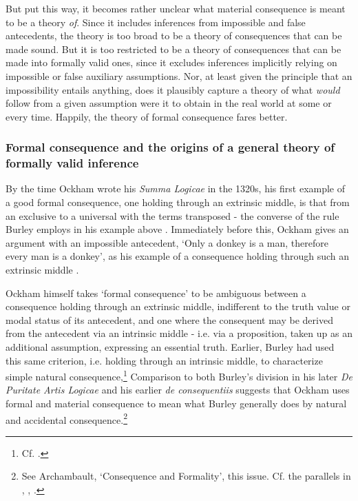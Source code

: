\documentclass[]{article}
\begin{document}
But put this way, it becomes rather unclear what material consequence is meant to be a theory \textit{of}. Since it includes inferences from impossible and false antecedents, the theory is too broad to be a theory of consequences that can be made sound. But it is too restricted to be a theory of consequences that can be made into formally valid ones, since it excludes inferences implicitly relying on impossible or false auxiliary assumptions. Nor, at least given the principle that an impossibility entails anything, does it plausibly capture a theory of what \textit{would} follow from a given assumption were it to obtain in the real world at some or every time. Happily, the theory of formal consequence fares better.
\subsubsection{Formal consequence and the origins of a general theory of formally valid inference}
By the time Ockham wrote his \textit{Summa Logicae} in the 1320s, his first example of a good formal consequence, one holding through an extrinsic middle, is that from an exclusive to a universal with the terms transposed - the converse of the rule Burley employs in his example above \autocite[III-3, c.1, p. 589.46-50]{OckhamSL}. Immediately before this, Ockham gives an argument with an impossible antecedent, `Only a donkey is a man, therefore every man is a donkey', as his example of a consequence holding through such an extrinsic middle \autocite[III-3, c. 1, p. 588.28-35]{OckhamSL}. 

Ockham himself takes `formal consequence' to be ambiguous between a consequence holding through an extrinsic middle, indifferent to the truth value or modal status of its antecedent, and one where the consequent may be derived from the antecedent via an intrinsic middle - i.e. via a proposition, taken up as an additional assumption, expressing an essential truth. Earlier, Burley had used this same criterion, i.e. holding through an intrinsic middle,  to characterize simple natural consequence,\footnote{Cf.  \autocite[V, par. 70. p. 128; VIII, par. 116, pp. 141-142]{Green-Pedersen1980b}.} Comparison to both Burley's division in his later \textit{De Puritate Artis Logicae} and his earlier \textit{de consequentiis} suggests that Ockham uses formal and material consequence to mean what Burley generally does by natural and accidental consequence.\footnote{See Archambault, `Consequence and Formality', this issue. Cf. the parallels in \autocite[VIII. par. 188, pp. 142-143]{Green-Pedersen1980b}, \autocite[p. 86.9-21]{BurleyDPAL}, \autocite[II, c. 7, par. 8, 204.124-205.154]{OckhamExpositio} \autocite[IV, c. 1, 15.1-17]{OckhamSentences}.} 
\end{document}
